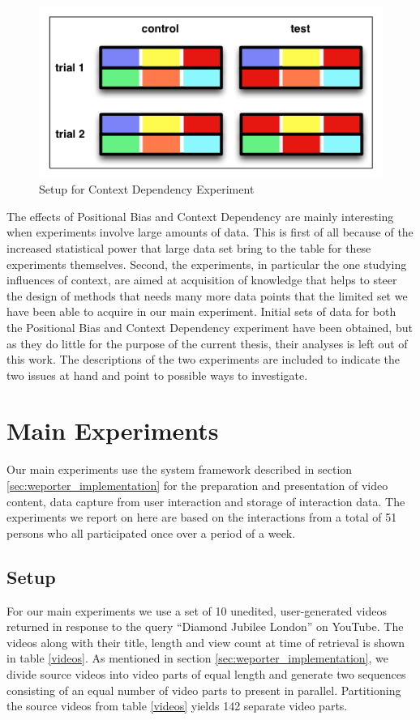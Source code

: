 \begin{figure}[htbp]
  \centering
    \includegraphics[width = .5\textwidth]{img/exp_context}
  \caption{Setup for Context Dependency Experiment}
  \label{fig:exp_context}
\end{figure}


The effects of Positional Bias and Context Dependency are mainly interesting when experiments involve large amounts of data. This is first of all because of the increased statistical power that large data set bring to the table for these experiments themselves. Second, the experiments, in particular the one studying influences of context, are aimed at acquisition of knowledge that helps to steer the design of methods that needs many more data points that the limited set we have been able to acquire in our main experiment. Initial sets of data for both the Positional Bias and Context Dependency experiment have been obtained, but as they do little for the purpose of the current thesis, their analyses is left out of this work. The descriptions of the two experiments are included to indicate the two issues at hand and point to possible ways to investigate.

\section{Main Experiments} %
\label{sec:main_experiments}

Our main experiments use the system framework described in section \ref{sec:weporter_implementation} for the preparation and presentation of video content, data capture from user interaction and storage of interaction data. The experiments we report on here are based on the interactions from a total of 51 persons who all participated once over a period of a week.

\subsection{Setup}
For our main experiments we use a set of 10 unedited, user-generated videos returned in response to the query ``Diamond Jubilee London'' on YouTube. The videos along with their title, length and view count at time of retrieval is shown in table \ref{videos}. As mentioned in section \ref{sec:weporter_implementation}, we divide source videos into video parts of equal length and generate two sequences consisting of an equal number of video parts to present in parallel. Partitioning the source videos from table \ref{videos} yields 142 separate video parts.

